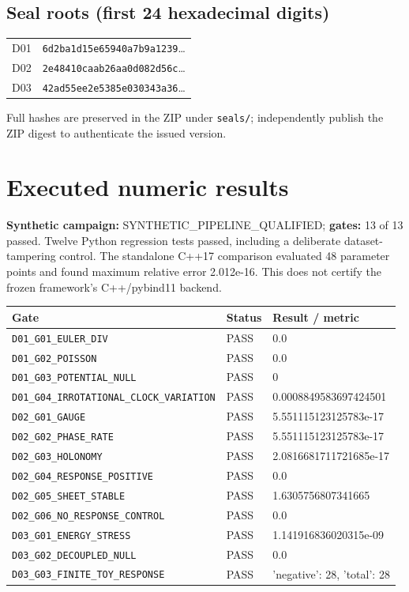 \documentclass[10pt,a4paper]{article}
\begin{document}
\subsection*{Seal roots (first 24 hexadecimal digits)}
\begin{center}\begin{tabular}{@{}ll@{}}\toprule
D01 & \texttt{6d2ba1d15e65940a7b9a1239}\quad\ldots\\
D02 & \texttt{2e48410caab26aa0d082d56c}\quad\ldots\\
D03 & \texttt{42ad55ee2e5385e030343a36}\quad\ldots\\\bottomrule
\end{tabular}\end{center}
Full hashes are preserved in the ZIP under \texttt{seals/}; independently publish the ZIP digest to authenticate the issued version.

\section{Executed numeric results}
\textbf{Synthetic campaign:} SYNTHETIC\_PIPELINE\_QUALIFIED; 
\textbf{gates:} 13 of 13 passed. Twelve Python regression tests passed, including a deliberate dataset-tampering control.
The standalone C++17 comparison evaluated 48 parameter points and found maximum relative error 2.012e-16. This does not certify the frozen framework's C++/pybind11 backend.

\begin{longtable}{@{}p{80mm}p{15mm}p{58mm}@{}}
\toprule Gate & Status & Result / metric\\\midrule\endhead
\texttt{D01\_G01\_EULER\_DIV} & PASS & 0.0 \\
\texttt{D01\_G02\_POISSON} & PASS & 0.0 \\
\texttt{D01\_G03\_POTENTIAL\_NULL} & PASS & 0 \\
\texttt{D01\_G04\_IRROTATIONAL\_CLOCK\_VARIATION} & PASS & 0.0008849583697424501 \\
\texttt{D02\_G01\_GAUGE} & PASS & 5.551115123125783e-17 \\
\texttt{D02\_G02\_PHASE\_RATE} & PASS & 5.551115123125783e-17 \\
\texttt{D02\_G03\_HOLONOMY} & PASS & 2.0816681711721685e-17 \\
\texttt{D02\_G04\_RESPONSE\_POSITIVE} & PASS & 0.0 \\
\texttt{D02\_G05\_SHEET\_STABLE} & PASS & 1.6305756807341665 \\
\texttt{D02\_G06\_NO\_RESPONSE\_CONTROL} & PASS & 0.0 \\
\texttt{D03\_G01\_ENERGY\_STRESS} & PASS & 1.141916836020315e-09 \\
\texttt{D03\_G02\_DECOUPLED\_NULL} & PASS & 0.0 \\
\texttt{D03\_G03\_FINITE\_TOY\_RESPONSE} & PASS & {'negative': 28, 'total': 28} \\
\bottomrule
\end{longtable}
\end{document}
